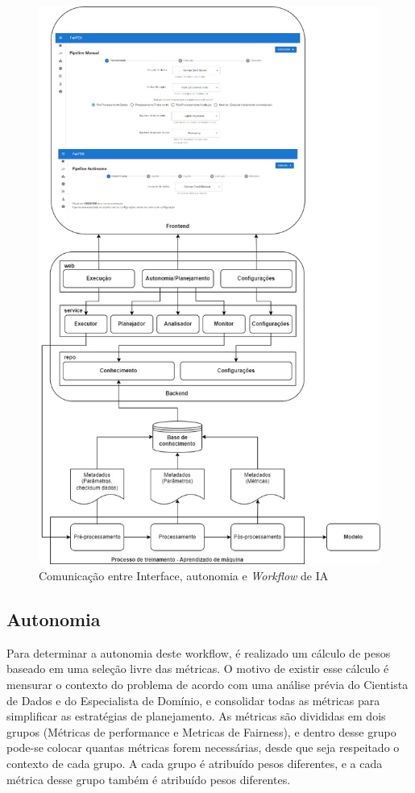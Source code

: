 \documentclass[twocolumn]{article}
\begin{document}
\begin{figure}[H]
\centering
\includegraphics[scale=0.3]{images/backend-frontend-ml.jpg}
\caption {Comunicação entre Interface, autonomia e \textit{Workflow} de IA}
\label{fig:BackendFrontendML}
\end{figure}

\subsection{Autonomia}

Para determinar a autonomia deste workflow, é realizado um cálculo de pesos baseado em uma seleção livre das métricas. O motivo de existir esse cálculo é mensurar o contexto do problema de acordo com uma análise prévia do Cientista de Dados e do Especialista de Domínio, e consolidar todas as métricas para simplificar as estratégias de planejamento. As métricas são divididas em dois grupos (Métricas de performance e Metricas de Fairness), e dentro desse grupo pode-se colocar quantas métricas forem necessárias, desde que seja respeitado o contexto de cada grupo. A cada grupo é atribuído pesos diferentes, e a cada métrica desse grupo também é atribuído pesos diferentes.
\end{document}

